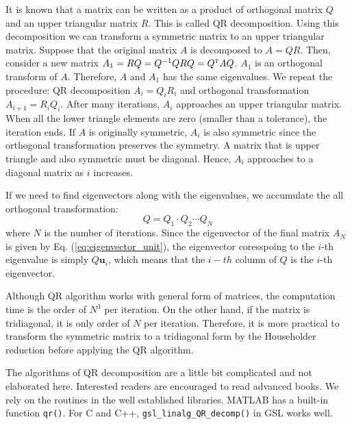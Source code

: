 {It is known that a matrix can be written as a product of orthogonal matrix $Q$ and an upper triangular matrix $R$. This is called QR decomposition.   Using this decomposition we can transform a symmetric matrix to an upper triangular matrix.  Suppose that the original matrix $A$ is decomposed to $A=QR$.  Then, consider a new matrix $A_1 = RQ = Q^{-1} Q R Q = Q^\textsc{t} A Q$.  $A_1$ is an orthogonal transform of $A$.  Therefore, $A$ and $A_1$ has the same eigenvalues.  We repeat the procedure:  QR decomposition $A_i = Q_i R_i$ and orthogonal transformation $A_{i+1} = R_i Q_i$.  After many iterations, $A_i$ approaches an upper triangular matrix.  When all the lower triangle elements are zero (smaller than a tolerance), the iteration ends.  If $A$ is originally symmetric, $A_i$ is also symmetric since the orthogonal transformation preserves the symmetry.  A matrix that is upper triangle and also symmetric must be diagonal.  Hence, $A_i$ approaches to a diagonal matrix as $i$ increases. 

If we need to find eigenvectors along with the eigenvalues, we accumulate the all orthogonal transformation:
\begin{equation}
Q = Q_1 \cdot Q_2 \cdots Q_N
\end{equation}
where $N$ is the number of iterations.
Since the eigenvector of the final matrix $A_N$ is given by Eq. (\ref{eq:eigenvector_unit}), the eigenvector coresspoing to the $i$-th eigenvalue is simply $Q \mathbf{u}_i$, which means that the $i-th$ column of $Q$ is the $i$-th eigenvector. 

Although QR algorithm works with general form of matrices, the computation time is the order of $N^3$ per iteration.  On the other hand, if the matrix is tridiagonal, it is only order of $N$ per iteration. Therefore, it is more practical to transform the symmetric matrix to a tridiagonal form by the Householder reduction before applying the QR algorithm.

The algorithms of QR decomposition are a little bit complicated and not elaborated here.  Interested readers are encouraged to read advanced books.\cite{numerical_recipes,matrix_comp}   We rely on the routines in the well established libraries.  MATLAB has a built-in function \texttt{qr()}.  For C and C++, \texttt{gsl\_linalg\_QR\_decomp()} in GSL works well.\cite{gsl}

}
